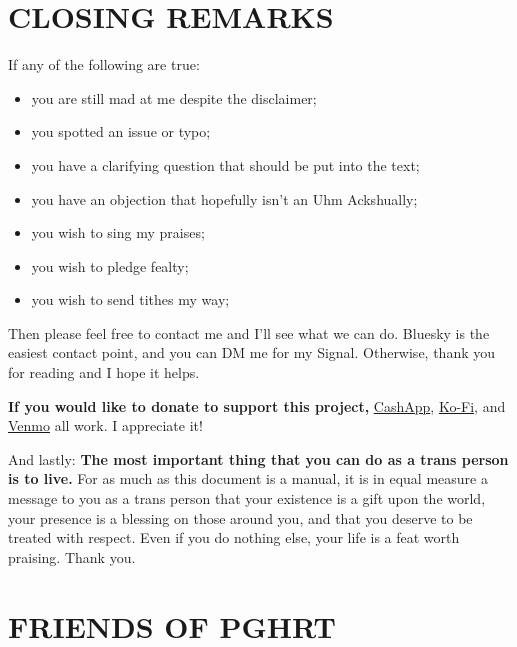 \documentclass{article}
\begin{document}
 

\section{CLOSING REMARKS}

If any of the following are true:

\begin{itemize}
\item you are still mad at me despite the disclaimer;

\item you spotted an issue or typo;

\item you have a clarifying question that should be put into the text;

\item you have an objection that hopefully isn’t an Uhm Ackshually;

\item you wish to sing my praises;

\item you wish to pledge fealty; 

\item you wish to send tithes my way;
\end{itemize}

Then please feel free to contact me and I’ll see what we can do. Bluesky is the easiest contact point, and you can DM me for my Signal. Otherwise, thank you for reading and I hope it helps.

\textbf{If you would like to donate to support this project,} \href{https://cash.app/Katitties}{CashApp}, \href{https://ko-fi.com/katitties}{Ko-Fi}, and \href{https://account.venmo.com/u/katitties}{Venmo} all work. I appreciate it!

And lastly: \textbf{The most important thing that you can do as a trans person is to live.} For as much as this document is a manual, it is in equal measure a message to you as a trans person that your existence is a gift upon the world, your presence is a blessing on those around you, and that you deserve to be treated with respect. Even if you do nothing else, your life is a feat worth praising. Thank you.



\section*{FRIENDS OF PGHRT}\label{FOPGHRT}
\end{document}
